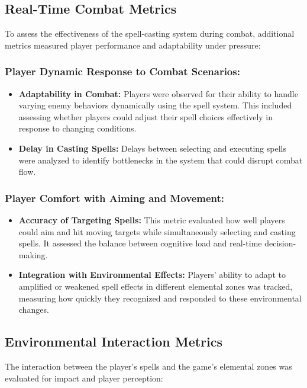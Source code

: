 \documentclass[10pt,twocolumn]{article}
\begin{document}
\subsection{Real-Time Combat Metrics}
To assess the effectiveness of the spell-casting system during combat, additional metrics measured player performance and adaptability under pressure:

\subsubsection{Player Dynamic Response to Combat Scenarios:}

\begin{itemize}
    \item \textbf{Adaptability in Combat:} Players were observed for their ability to handle varying enemy behaviors dynamically using the spell system. This included assessing whether players could adjust their spell choices effectively in response to changing conditions.
    \item \textbf{Delay in Casting Spells:} Delays between selecting and executing spells were analyzed to identify bottlenecks in the system that could disrupt combat flow.
\end{itemize}

\subsubsection{Player Comfort with Aiming and Movement:}

\begin{itemize}
    \item \textbf{Accuracy of Targeting Spells:} This metric evaluated how well players could aim and hit moving targets while simultaneously selecting and casting spells. It assessed the balance between cognitive load and real-time decision-making.
    \item \textbf{Integration with Environmental Effects:} Players’ ability to adapt to amplified or weakened spell effects in different elemental zones was tracked, measuring how quickly they recognized and responded to these environmental changes.
\end{itemize}

\subsection{Environmental Interaction Metrics}
The interaction between the player’s spells and the game’s elemental zones was evaluated for impact and player perception:
\end{document}
